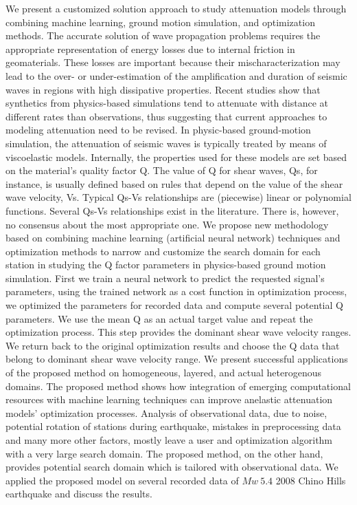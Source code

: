 %
We present a customized solution approach to study attenuation models through combining machine learning, ground motion simulation, and optimization methods. The accurate solution of wave propagation problems requires the appropriate representation of energy losses due to internal friction in geomaterials. These losses are important because their mischaracterization may lead to the over- or under-estimation of the amplification and duration of seismic waves in regions with high dissipative properties. Recent studies show that synthetics from physics-based simulations tend to attenuate with distance at different rates than observations, thus suggesting that current approaches to modeling attenuation need to be revised. In physic-based ground-motion simulation, the attenuation of seismic waves is typically treated by means of viscoelastic models. Internally, the properties used for these models are set based on the material's quality factor Q. The value of Q for shear waves, Qs, for instance, is usually defined based on rules that depend on the value of the shear wave velocity, Vs.  Typical Qs-Vs relationships are (piecewise) linear or polynomial functions. Several Qs-Vs relationships exist in the literature. There is, however, no consensus about the most appropriate one. We propose new methodology based on  combining machine learning (artificial neural network) techniques and optimization methods to narrow and customize the search domain for each station in studying the Q factor parameters in physics-based ground motion simulation. First we train a neural network to predict the requested signal's parameters, using the trained network as a cost function in optimization process, we optimized the parameters for recorded data and compute several potential Q parameters. We use the mean Q as an actual target value and repeat the optimization process. This step provides the dominant shear wave velocity ranges. We return back to the original optimization results and choose the Q data that belong to dominant shear wave velocity range. We present successful applications of the proposed method on homogeneous, layered, and actual heterogenous domains. The proposed method shows how integration of emerging computational resources with machine learning techniques can improve anelastic attenuation models' optimization processes. Analysis of observational data, due to noise, potential rotation of stations during earthquake, mistakes in preprocessing data and many more other factors, mostly leave a user and optimization algorithm with a very large search domain. The proposed method, on the other hand,  provides potential search domain which is tailored with observational data. We applied the proposed model on several recorded data of  $Mw ~5.4$ 2008 Chino Hills earthquake and discuss the results. 



